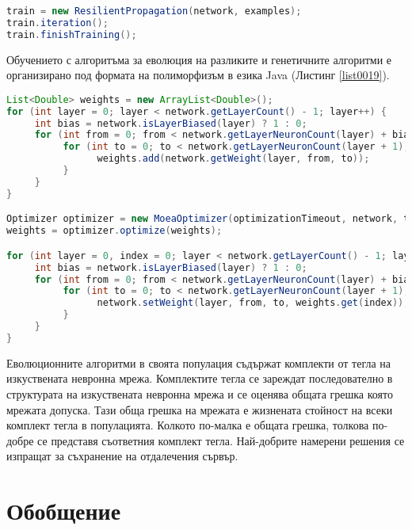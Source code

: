 \begin{lstlisting}[caption=Обучение с обратно разпространение на грешката, language=Java, basicstyle=\tiny, label=list0018]
train = new ResilientPropagation(network, examples);
train.iteration();
train.finishTraining();
\end{lstlisting}

Обучението с алгоритъма за еволюция на разликите и генетичните алгоритми е организирано под формата на полиморфизъм в езика Java (Листинг \ref{list0019}).

\begin{lstlisting}[caption=Обучение с еволюционни евристични алгоритми, language=Java, basicstyle=\tiny, label=list0019]
List<Double> weights = new ArrayList<Double>();
for (int layer = 0; layer < network.getLayerCount() - 1; layer++) {
	 int bias = network.isLayerBiased(layer) ? 1 : 0;
	 for (int from = 0; from < network.getLayerNeuronCount(layer) + bias; from++) {
		  for (int to = 0; to < network.getLayerNeuronCount(layer + 1); to++) {
				weights.add(network.getWeight(layer, from, to));
		  }
	 }
}

Optimizer optimizer = new MoeaOptimizer(optimizationTimeout, network, train, populationSize, crossoverRate, scalingFactor);
weights = optimizer.optimize(weights);

for (int layer = 0, index = 0; layer < network.getLayerCount() - 1; layer++) {
	 int bias = network.isLayerBiased(layer) ? 1 : 0;
	 for (int from = 0; from < network.getLayerNeuronCount(layer) + bias; from++) {
		  for (int to = 0; to < network.getLayerNeuronCount(layer + 1); to++, index++) {
				network.setWeight(layer, from, to, weights.get(index));
		  }
	 }
}
\end{lstlisting}

Еволюционните алгоритми в своята популация съдържат комплекти от тегла на изкуствената невронна мрежа. Комплектите тегла се зареждат последователно в структурата на изкуствената невронна мрежа и се оценява общата грешка която мрежата допуска. Тази обща грешка на мрежата е жизнената стойност на всеки комплект тегла в популацията. Колкото по-малка е общата грешка, толкова по-добре се представя съответния комплект тегла. Най-добрите намерени решения се изпращат за съхранение на отдалечения сървър. 

\section{Обобщение}


